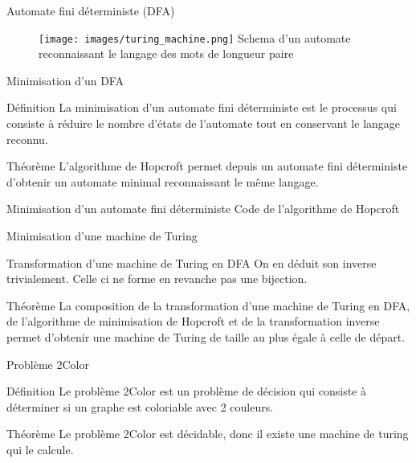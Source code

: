 \documentclass{beamer}
\begin{document}
    \begin{frame}{Automate fini déterministe (DFA)}
        \begin{figure}
            \texttt{[image: images/turing\_machine.png]}
            Schema d'un automate reconnaissant le langage des mots de longueur 
            paire
        \end{figure}
    \end{frame}
    \begin{frame}{Minimisation d'un DFA}
        \begin{alert}{Définition}
            La minimisation d'un automate fini déterministe est le processus 
            qui consiste à réduire le nombre d'états de l'automate tout en 
            conservant le langage reconnu. 
        \end{alert}
        \begin{block}{Théorème}
            L'algorithme de Hopcroft permet depuis un automate fini déterministe 
            d'obtenir un automate minimal reconnaissant le même langage.
        \end{block}
    \end{frame}
    \begin{frame}{Minimisation d'un automate fini déterministe}
            Code de l'algorithme de Hopcroft
    \end{frame}
    \begin{frame}{Minimisation d'une machine de Turing}
        \begin{alert}{Transformation d'une machine de Turing en DFA}
            On en déduit son inverse trivialement. Celle ci ne forme en revanche pas 
            une bijection.
        \end{alert}
        \begin{block}{Théorème}
            La composition de la transformation d'une machine de Turing en DFA, de 
            l'algorithme de minimisation de Hopcroft et de la transformation inverse
            permet d'obtenir une machine de Turing de taille au plus égale à celle de
            départ.
        \end{block}
    \end{frame}
    \begin{frame}{Problème 2Color}
        \begin{alert}{Définition}
            Le problème 2Color est un problème de décision qui consiste à déterminer 
            si un graphe est coloriable avec 2 couleurs. 
        \end{alert}
        \begin{block}{Théorème}
            Le problème 2Color est décidable, donc il existe une machine de turing qui 
            le calcule.
        \end{block}
    \end{frame}
\end{document}
